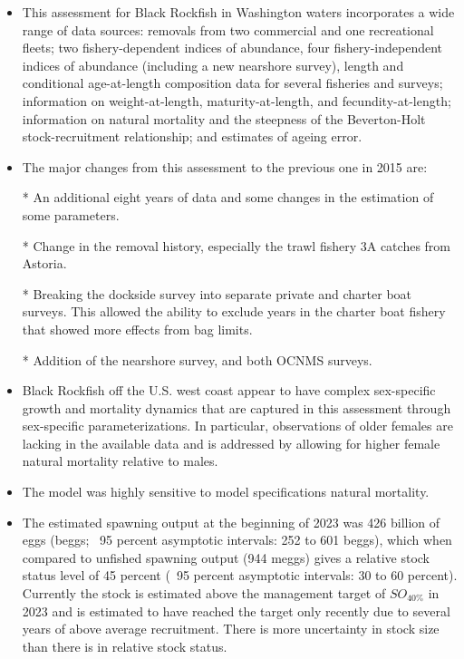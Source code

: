 \documentclass[11pt,
  letterpaper,
]{article}
\begin{document}
\begin{itemize}

\item This assessment for Black Rockfish in Washington waters incorporates a wide range of data sources: removals from two commercial and one recreational fleets; two fishery-dependent indices of abundance, four fishery-independent indices of abundance (including a new nearshore survey), length and conditional age-at-length composition data for several fisheries and surveys; information on weight-at-length, maturity-at-length, and fecundity-at-length; information on natural mortality and the steepness of the Beverton-Holt stock-recruitment relationship; and estimates of ageing error.

\item The major changes from this assessment to the previous one in 2015 are:

* An additional eight years of data and some changes in the estimation of some parameters.

* Change in the removal history, especially the trawl fishery 3A catches from Astoria.

* Breaking the dockside survey into separate private and charter boat surveys. This allowed the ability to exclude years in the charter boat fishery that showed more effects from bag limits.

* Addition of the nearshore survey, and both OCNMS surveys.


\item Black Rockfish off the U.S. west coast appear to have complex sex-specific growth and mortality dynamics that are captured in this assessment through sex-specific parameterizations. In particular, observations of older females are lacking in the available data and is addressed by allowing for higher female natural mortality relative to males.

\item The model was highly sensitive to model specifications natural mortality. 

\item The estimated spawning output at the beginning of 2023 was 426 billion of eggs (beggs; ~95 percent asymptotic intervals: 252 to 601 beggs), which when compared to unfished spawning output (944 meggs) gives a relative stock status level of 45 percent (~95 percent asymptotic intervals: 30 to 60 percent).  Currently the stock is estimated above the management target of $SO_{40\%}$ in 2023 and is estimated to have reached the target only recently due to several years of above average recruitment. There is more uncertainty in stock size than there is in relative stock status.


\end{itemize}
\end{document}
